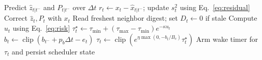 \begin{algorithm}[t]
\small
\caption{One \system scheduler update}
\label{alg:scheduler}
\DontPrintSemicolon
{}
Predict $\hat{z}_{t|t^-}$ and $P_{t|t^-}$ over $\Delta t$\;
$r_t\leftarrow x_t-\hat{x}_{t|t^-}$; update $s_t^2$ using Eq.~\eqref{eq:residual}\;
Correct $\hat{z}_t,P_t$ with $x_t$\;
Read freshest neighbor digest; set $D_t\leftarrow0$ if stale\;
Compute $u_t$ using Eq.~\eqref{eq:risk}\;
$\tau_t^\star\leftarrow\tau_{\min}+(\tau_{\max}-\tau_{\min})e^{-\kappa u_t}$\;
$b_t\leftarrow\operatorname{clip}(b_{t^-}+p_b\Delta t-e_t)$\;
$\tau_t\leftarrow\operatorname{clip}(e^{\eta\max(0,-b_t/B_c)}\tau_t^\star)$\;
Arm wake timer for $\tau_t$ and persist scheduler state\;
\end{algorithm}
